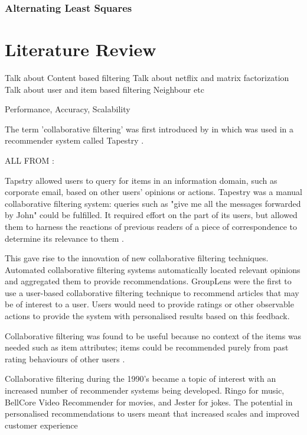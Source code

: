 \subsubsection{Alternating Least Squares}


\section{Literature Review}

Talk about Content based filtering
Talk about netflix and matrix factorization
Talk about user and item based filtering
Neighbour etc

Performance,
Accuracy,
Scalability

The term 'collaborative filtering' was first introduced by \citeauthor{goldberg1992using} in \citeyear{goldberg1992using} which was used in a recommender system called Tapestry \cite{koren2009matrix, goldberg1992using}. 

ALL FROM : \cite{}

Tapstry \cite{goldberg1992using} allowed users to query for items in an information domain, such as corporate email, based on other users' opinions or actions. Tapestry was a manual collaborative filtering system: queries such as "give me all the messages forwarded by John" could be fulfilled. It required effort on the part of its users, but allowed them to harness the reactions of previous readers of a piece of correspondence to determine its relevance to them \cite{grouplens}. 

This gave rise to the innovation of new collaborative filtering techniques. Automated collaborative filtering systems automatically located relevant opinions and aggregated them to provide recommendations. GroupLens \cite{grouplens} were the first to use a user-based collaborative filtering technique to recommend articles that may be of interest to a user. Users would need to provide ratings or other observable actions to provide the system with personalised results based on this feedback. 

Collaborative filtering was found to be useful because no context of the items was needed such as item attributes; items could be recommended purely from past rating behaviours of other users \cite{koren2009matrix, grouplens}. 


Collaborative filtering during the 1990's became a topic of interest with an increased number of recommender systems being developed. Ringo for music, BellCore Video Recommender for movies, and Jester for jokes. The potential in personalised recommendations to users meant that increased scales and improved customer experience 

